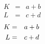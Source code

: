 \documentclass{article}
\begin{document}
\begin{eqnarray}
K &=& a + b &\\
L &=& c + d &
\end{eqnarray}
\begin{eqnarray*}
K &=& a + b &\cr
L &=& c + d &
\end{eqnarray*}
\end{document}

